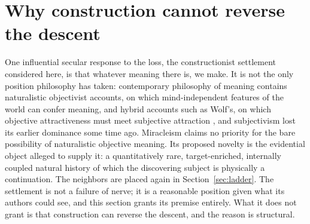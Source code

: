 \section{Why construction cannot reverse the descent}\label{sec:construction}

One influential secular response to the loss, the constructionist
settlement considered here, is that whatever meaning there is, we make.
It is not the only position philosophy has taken: contemporary
philosophy of meaning contains naturalistic objectivist accounts, on
which mind-independent features of the world can confer meaning, and
hybrid accounts such as Wolf's, on which objective attractiveness must
meet subjective attraction \cite{Wolf10,MetzSEP}, and subjectivism
lost its earlier dominance some time ago. Miracleism claims no priority
for the bare possibility of naturalistic objective meaning. Its
proposed novelty is the evidential object alleged to supply it: a
quantitatively rare, target-enriched, internally coupled natural
history of which the discovering subject is physically a continuation.
The neighbors are placed again in Section~\ref{sec:ladder}. The settlement is not a failure of
nerve; it is a reasonable position given what its authors could see,
and this section grants its premise entirely. What it does not grant is that
construction can reverse the descent, and the reason is structural.

